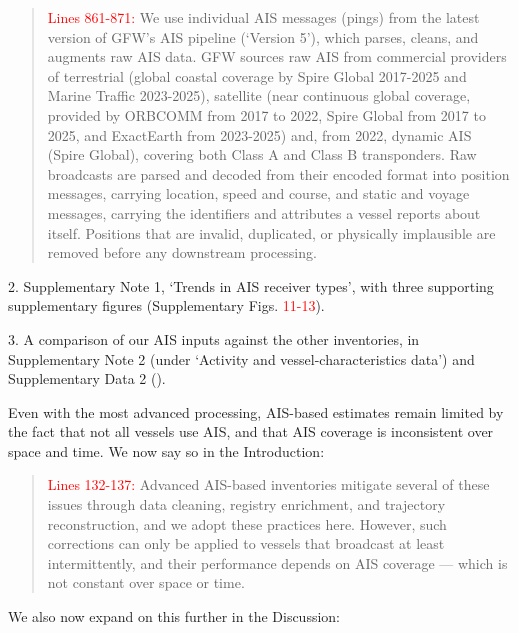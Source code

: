 \documentclass[11pt]{article}
\begin{document}
\begin{quote}
\textcolor{red}{Lines 861-871:}
We use individual AIS messages (pings) from the latest version of GFW’s AIS pipeline (`Version 5'), which parses, cleans, and augments raw AIS data. GFW sources raw AIS from commercial providers of terrestrial (global coastal coverage by Spire Global 2017-2025 and Marine Traffic 2023-2025), satellite (near continuous global coverage, provided by ORBCOMM from 2017 to 2022, Spire Global from 2017 to 2025, and ExactEarth from 2023-2025) and, from 2022, dynamic AIS (Spire Global), covering both Class A and Class B transponders. Raw broadcasts are parsed and decoded from their encoded format into position messages, carrying location, speed and course, and static and voyage messages, carrying the identifiers and attributes a vessel reports about itself. Positions that are invalid, duplicated, or physically implausible are removed before any downstream processing.
\end{quote}
 
2. Supplementary Note 1, `Trends in AIS receiver types', with three supporting supplementary figures (Supplementary Figs. \textcolor{red}{11-13}).

3. A comparison of our AIS inputs against the other inventories, in
Supplementary Note 2 (under `Activity and vessel-characteristics data') and Supplementary Data 2 ().

Even with the most advanced processing, AIS-based estimates remain limited by the fact that not all vessels use AIS, and that AIS coverage is inconsistent over space and time. We now say so in the Introduction:

\begin{quote}
\textcolor{red}{Lines 132-137:} 
Advanced AIS-based inventories mitigate several of these issues through data cleaning, registry enrichment, and trajectory reconstruction, and we adopt these practices here. However, such corrections can only be applied to vessels that broadcast at least intermittently, and their performance depends on AIS coverage — which is not constant over space or time.
\end{quote}

We also now expand on this further in the Discussion:
\end{document}
